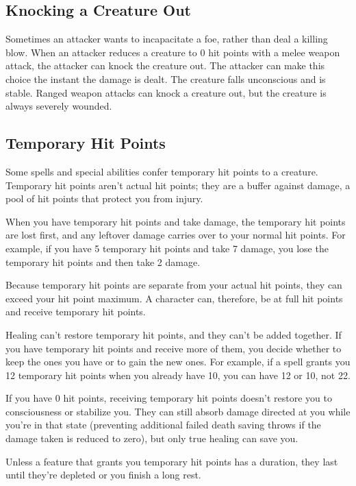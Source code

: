 \subsection{Knocking a Creature Out}

Sometimes an attacker wants to incapacitate a foe, rather than deal a killing blow. When an attacker reduces a creature to 0 hit points with a melee weapon attack, the attacker can knock the creature out. The attacker can make this choice the instant the damage is dealt. The creature falls unconscious and is stable. Ranged weapon attacks can knock a creature out, but the creature is always severely wounded.

\subsection{Temporary Hit Points}

Some spells and special abilities confer temporary hit points to a creature. Temporary hit points aren't actual hit points; they are a buffer against damage, a pool of hit points that protect you from injury.

When you have temporary hit points and take damage, the temporary hit points are lost first, and any leftover damage carries over to your normal hit points. For example, if you have 5 temporary hit points and take 7 damage, you lose the temporary hit points and then take 2 damage.

Because temporary hit points are separate from your actual hit points, they can exceed your hit point maximum. A character can, therefore, be at full hit points and receive temporary hit points.

Healing can't restore temporary hit points, and they can't be added together. If you have temporary hit points and receive more of them, you decide whether to keep the ones you have or to gain the new ones. For example, if a spell grants you 12 temporary hit points when you already have 10, you can have 12 or 10, not 22.

If you have 0 hit points, receiving temporary hit points doesn't restore you to consciousness or stabilize you. They can still absorb damage directed at you while you're in that state (preventing additional failed death saving throws if the damage taken is reduced to zero), but only true healing can save you.

Unless a feature that grants you temporary hit points has a duration, they last until they're depleted or you finish a long rest.


